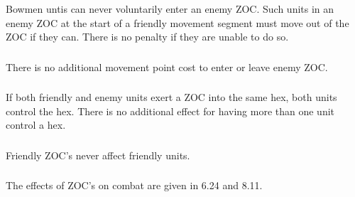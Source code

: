 \subsubsection[Bowmen and ZOCs]{} Bowmen untis can never voluntarily enter an enemy ZOC. Such units in an enemy ZOC at the start of a friendly movement segment must move out of the ZOC if they can. There is no penalty if they are unable to do so.

\subsubsection[MP and ZOCs]{} There is no additional movement point cost to enter or leave enemy ZOC.

\subsubsection[Competing ZOCs]{} If both friendly and enemy units exert a ZOC into the same hex, both units control the hex. There is no additional effect for having more than one unit control a hex.

\subsubsection[Friendly ZOCs]{} Friendly ZOC's never affect friendly units.

\subsubsection[ZOCs and Combat]{} The effects of ZOC's on combat are given in 6.24 and 8.11.